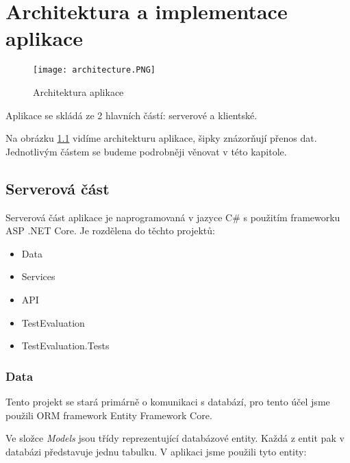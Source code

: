 \chapter{Architektura a implementace aplikace}

\begin{figure}
	\centering
	\texttt{[image: architecture.PNG]}
	\caption{Architektura aplikace}
	\label{fig:Architecture}
\end{figure}

Aplikace se skládá ze 2 hlavních částí: serverové a klientské.

Na obrázku \ref{fig:Architecture} vidíme architekturu aplikace, šipky znázorňují přenos dat. Jednotlivým částem se budeme podrobněji věnovat v této kapitole.

\section{Serverová část}

Serverová část aplikace je naprogramovaná v jazyce C\# s použitím 
frameworku ASP .NET Core. Je rozdělena do těchto projektů:

\begin{itemize}
	\item Data
	\item Services
	\item API
	\item TestEvaluation
	\item TestEvaluation.Tests
\end{itemize}

\subsection{Data}

Tento projekt se stará primárně o komunikaci s databází, pro tento účel jsme použili ORM framework Entity Framework Core. 

Ve složce \textit{Models} jsou třídy reprezentující databázové entity. Každá z entit pak v databázi představuje jednu tabulku. V aplikaci jsme použili tyto entity:

